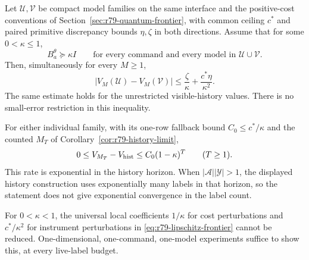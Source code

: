 \begin{corollary}
\label{cor:r79-positive-success}
Let $\mathcal U,\mathcal V$ be compact model families on the same
interface and the positive-cost conventions of
Section~\ref{sec:r79-quantum-frontier}, with common ceiling $c^*$ and paired
primitive discrepancy bounds $\eta,\zeta$ in both directions.
Assume that for some $0<\kappa\le1$,
\begin{equation}\label{eq:r79-success-floor}
 B^\theta_a\succeq\kappa I
 \qquad\text{for every command and every model in }
                         \mathcal U\cup\mathcal V.
\end{equation}
Then, simultaneously for every $M\ge1$,
\begin{equation}\label{eq:r79-lipschitz-frontier}
 |V_M(\mathcal U)-V_M(\mathcal V)|
          \le\frac{\zeta}{\kappa}
                         +\frac{c^*\eta}{\kappa^2}.
\end{equation}
The same estimate holds for the unrestricted visible-history
values.  There is no small-error restriction in this inequality.

For either individual family, with its one-row fallback bound
$C_0\le c^*/\kappa$ and the counted $M_T$ of
Corollary~\ref{cor:r79-history-limit},
\begin{equation}\label{eq:r79-geometric-history}
 0\le V_{M_T}-V_{\rm hist}
                     \le C_0(1-\kappa)^T\qquad(T\ge1).
\end{equation}
This rate is exponential in the history horizon.  When
$|\mathcal A||\mathcal Y|>1$, the displayed history construction
uses exponentially many labels in that horizon, so the statement
does not give exponential convergence in the label count.

For $0<\kappa<1$, the universal local coefficients
$1/\kappa$ for cost perturbations and $c^*/\kappa^2$ for
instrument perturbations in \eqref{eq:r79-lipschitz-frontier}
cannot be reduced.  One-dimensional, one-command, one-model
experiments suffice to show this, at every live-label budget.
\end{corollary}

